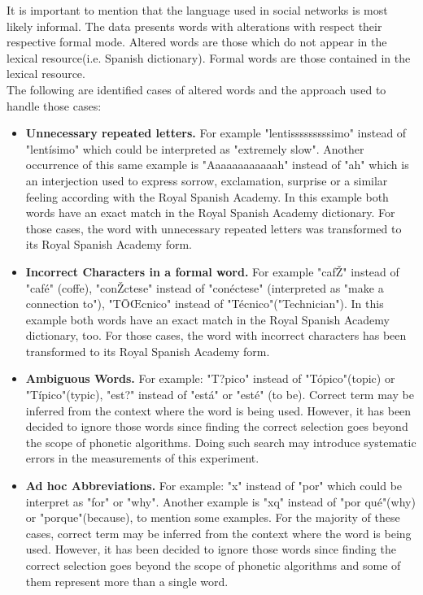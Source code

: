 \documentclass[9pt,conference]{IEEEtran}
\begin{document}
It is important to mention that the language used in social networks is most likely informal.
The data presents words with alterations with respect their respective formal mode. Altered 
words are those which do not appear in the lexical resource(i.e. Spanish dictionary). 
Formal words are those contained in the lexical resource.\\

The following are identified cases of altered words and the approach used to handle those
cases:\\
\begin{itemize}
\item \textbf{Unnecessary repeated letters.}
For example "lentisssssssssimo" 
instead of "lent{\'i}simo" which could be interpreted as "extremely slow". Another occurrence 
of this same example is "Aaaaaaaaaaaah" instead of "ah" which is an interjection used to
express sorrow, exclamation, surprise or a similar feeling according with the Royal Spanish
Academy. In this example both words have an exact match in the Royal Spanish Academy
dictionary. For those cases, the word with unnecessary repeated letters was transformed
to its Royal Spanish Academy form.\\

\item \textbf{Incorrect Characters in a formal word.}
  For example "caf\v{Z}" instead of "caf{\'e}" (coffe), 
"con\v{Z}ctese" instead of "con{\'e}ctese" (interpreted as "make a connection to"), "T\=O\OE cnico"
instead of "T{\'e}cnico"("Technician"). In this example both words have an exact match in the 
Royal Spanish Academy dictionary, too. For those cases, the word with incorrect characters
has been transformed to its Royal Spanish Academy form.\\

\item \textbf{Ambiguous Words.}
For example: "T?pico" instead of "T{\'o}pico"(topic) or "T{\'i}pico"(typic), "est?" instead of
 "est{\'a}" or "est{\'e}" (to be). Correct term may be inferred from the context where the 
word is being used. However, it has been decided to ignore those words since finding the 
correct selection goes beyond the scope of phonetic algorithms. Doing such search may 
introduce systematic errors in the measurements of this experiment.\\

\item \textbf{Ad hoc Abbreviations.}
For example: "x" instead of "por" which could be interpret as "for" or "why". Another example is "xq"
instead of "por qu{\'e}"(why) or "porque"(because), to mention some examples. For the
majority of these cases, correct term may be inferred from the context where the 
word is being used. However, it has been decided to ignore those words since finding the 
correct selection goes beyond the scope of phonetic algorithms and some of them
represent more than a single word.\\


\end{itemize}
\end{document}
